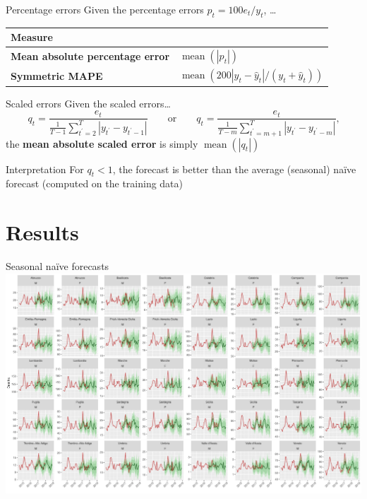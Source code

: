 \documentclass[12pt,aspectratio=169]{beamer}
\begin{document}
\begin{frame}{Percentage errors}
    Given the \alert{percentage} errors $p_{t} = 100 e_{t} / y_{t}$, \ldots
    \begin{center}
        \renewcommand{\arraystretch}{1.5}%
        \begin{tabular}{ll}
            \toprule
            \textbf{Measure} & \\
            \midrule
            \textbf{Mean absolute percentage error} & $\operatorname{mean}(|p_{t}|)$ \\
            \textbf{Symmetric MAPE}                 & $\operatorname{mean}(200 |y_{t} - \hat{y}_{t}| / (y_{t} + \hat{y}_{t}))$ \\
            \bottomrule
        \end{tabular}
    \end{center}
\end{frame}

\begin{frame}{Scaled errors}
    Given the \alert{scaled} errors\ldots
    \[
        q_{t} = \frac{e_{t}}{\frac{1}{T-1} \sum_{t^{\prime} = 2}^{T} |y_{t^{\prime}} - y_{t^{\prime}-1}|}
        \qquad
        \text{or}
        \qquad
        q_{t} = \frac{e_{t}}{\frac{1}{T-m} \sum_{t^{\prime} = m+1}^{T} |y_{t^{\prime}} - y_{t^{\prime}-m}|}
        \text{,}
    \]
    the \textbf{mean absolute scaled error} is simply
    $\operatorname{mean}(|q_{t}|)$
    \vfill
    \begin{block}{Interpretation}
        For $q_{t} < 1$, the forecast is better than the average (seasonal)
        naïve forecast (computed on the training data)
    \end{block}
\end{frame}

\section{Results}

\begin{frame}{Seasonal naïve forecasts}
    \centering%
    \includegraphics[height=0.9\textheight]{figures/forecasts_snaive}
\end{frame}
\end{document}
